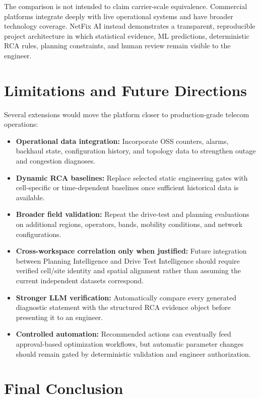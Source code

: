 The comparison is not intended to claim carrier-scale equivalence. Commercial platforms integrate deeply with live operational systems and have broader technology coverage. NetFix AI instead demonstrates a transparent, reproducible project architecture in which statistical evidence, ML predictions, deterministic RCA rules, planning constraints, and human review remain visible to the engineer.

\section{Limitations and Future Directions}

Several extensions would move the platform closer to production-grade telecom operations:

\begin{itemize}
\item \textbf{Operational data integration:} Incorporate OSS counters, alarms, backhaul state, configuration history, and topology data to strengthen outage and congestion diagnoses.
\item \textbf{Dynamic RCA baselines:} Replace selected static engineering gates with cell-specific or time-dependent baselines once sufficient historical data is available.
\item \textbf{Broader field validation:} Repeat the drive-test and planning evaluations on additional regions, operators, bands, mobility conditions, and network configurations.
\item \textbf{Cross-workspace correlation only when justified:} Future integration between Planning Intelligence and Drive Test Intelligence should require verified cell/site identity and spatial alignment rather than assuming the current independent datasets correspond.
\item \textbf{Stronger LLM verification:} Automatically compare every generated diagnostic statement with the structured RCA evidence object before presenting it to an engineer.
\item \textbf{Controlled automation:} Recommended actions can eventually feed approval-based optimization workflows, but automatic parameter changes should remain gated by deterministic validation and engineer authorization.
\end{itemize}

\section{Final Conclusion}


